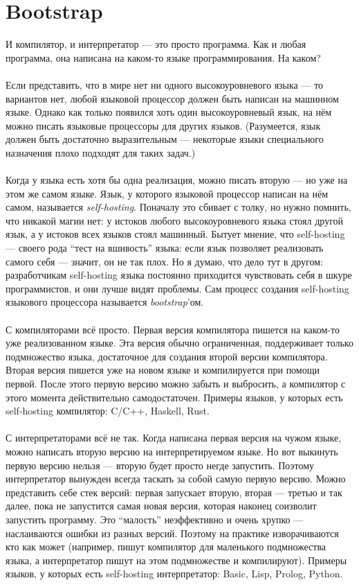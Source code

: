 \documentclass[11pt]{book}
\begin{document}
\section{Bootstrap}
И компилятор, и интерпретатор --- это просто программа.
Как и любая программа, она написана на каком-то языке программирования. На каком?
\\ \\
Если представить, что в мире нет ни одного высокоуровневого языка --- то вариантов нет,
любой языковой процессор должен быть написан на машинном языке.
Однако как только появился хоть один высокоуровневый язык, на нём можно писать языковые процессоры для других языков.
(Разумеется, язык должен быть достаточно выразительным  ---
некоторые языки специального назначения плохо подходят для таких задач.)
\\ \\
Когда у языка есть хотя бы одна реализация, можно писать вторую --- но уже на этом же самом языке.
Язык, у которого языковой процессор написан на нём самом, называется \emph{self-hosting}.
Поначалу это сбивает с толку, но нужно помнить, что никакой магии нет:
у истоков любого высокоуровневого языка стоял другой язык, а у истоков всех языков стоял машинный.
Бытует мнение, что self-hosting --- своего рода ``тест на вшивость'' языка:
если язык позволяет реализовать самого себя --- значит, он не так плох.
Но я думаю, что дело тут в другом: разработчикам self-hosting языка постоянно приходится
чувствовать себя в шкуре программистов, и они лучше видят проблемы.
Сам процесс создания self-hosting языкового процессора называется \emph{bootstrap}'ом.
\\ \\
С компиляторами всё просто.
Первая версия компилятора пишется на каком-то уже реализованном языке.
Эта версия обычно ограниченная, поддерживает только подмножество языка, достаточное для создания второй версии компилятора.
Вторая версия пишется уже на новом языке и компилируется при помощи первой.
После этого первую версию можно забыть и выбросить, а компилятор с этого момента действительно самодостаточен.
Примеры языков, у которых есть self-hosting компилятор: C/C++, Haskell, Rust.
\\ \\
С интерпретаторами всё не так.
Когда написана первая версия на чужом языке, можно написать вторую версию на интерпретируемом языке.
Но вот выкинуть первую версию нельзя --- вторую будет просто негде запустить.
Поэтому интерпретатор вынужден всегда таскать за собой самую первую версию.
Можно представить себе стек версий: первая запускает вторую, вторая --- третью и так далее,
пока не запустится самая новая версия, которая наконец соизволит запустить программу.
Это ``малость'' неэффективно и очень хрупко --- наслаиваются ошибки из разных версий.
Поэтому на практике изворачиваются кто как может (например, пишут компилятор для маленького подмножества языка,
а интерпретатор пишут на этом подмножестве и компилируют).
Примеры языков, у которых есть self-hosting интерпретатор: Basic, Lisp, Prolog, Python.
\end{document}
